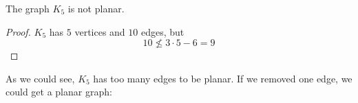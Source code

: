 \begin{thmbox}
    \begin{corollary}
        The graph $ K_5 $ is not planar.
    \end{corollary}
\end{thmbox}
\begin{proof}
    $ K_5 $ has $ 5 $ vertices and $ 10 $ edges, but
    \[ 10\nleqslant 3\cdot 5-6=9 \]
\end{proof}
As we could see, $ K_5 $ has too many edges to be planar.
If we removed one edge, we could get a planar graph:

\begin{figure}[!htbp]
    \centering
    \begin{tikzpicture}[x=0.75pt,y=0.75pt,yscale=-1,xscale=1]


\end{tikzpicture}
\end{figure}
